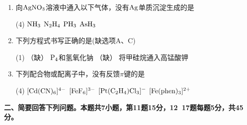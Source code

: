 \begin{enumerate}[label=\arabic*., itemsep=1.5ex]
    \item 向$\ce{AgNO3}$溶液中通入以下气体，没有$\ce{Ag}$单质沉淀生成的是
    \begin{tasks}(4)
        \task $\ce{NH3}$
        \task $\ce{N2H4}$
        \task $\ce{PH3}$
        \task $\ce{AsH3}$
    \end{tasks}

    \item 下列方程式书写正确的是(缺选项A、C)
    \begin{tasks}(1)
        \task （缺）
        \task $\ce{P4}$和氢氧化钠
        \task （缺）
        \task 将甲硅烷通入高锰酸钾
    \end{tasks}

    \item 下列配合物或配离子中，没有反馈$\pi$键的是
    \begin{tasks}(4)
        \task $[\ce{Cd(CN)6}]^{4-}$
        \task $[\ce{FeF6}]^{3-}$
        \task $[\ce{Pt(C2H4)Cl3}]^{-}$
        \task $[\ce{Fe(phen)3}]^{2+}$
    \end{tasks}
\end{enumerate}

\vspace{0.5cm}
\noindent\textbf{二、简要回答下列问题。本题共7小题，第11题15分，12~17题每题5分，共45分。}

